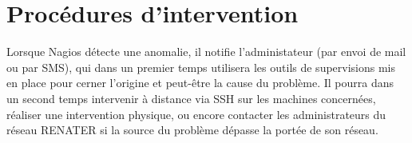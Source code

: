 \documentclass[a4paper]{article}
\begin{document}
\section{Procédures d'intervention}

Lorsque Nagios détecte une anomalie, il notifie l'administateur (par envoi de mail ou par SMS), qui dans un premier temps utilisera les outils de supervisions mis en place pour cerner l'origine et peut-être la cause du problème. Il pourra dans un second temps intervenir à distance via SSH sur les machines concernées, réaliser une intervention physique, ou encore contacter les administrateurs du réseau RENATER si la source du problème dépasse la portée de son réseau.
\end{document}
